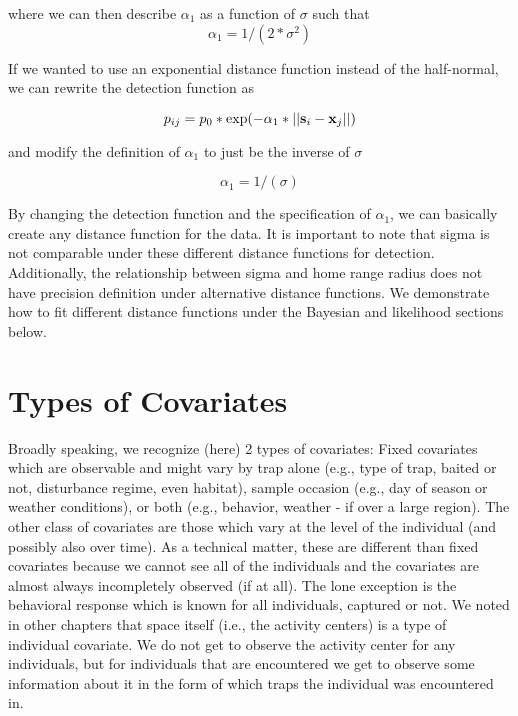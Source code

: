where we can then describe $\alpha_1$ as a function of $\sigma$ such that
\[
\alpha_{1} = 1/(2*\sigma^2)
\]

If we wanted to use an exponential distance function instead of the half-normal, we can rewrite the detection function as

\[
p_{ij} = p_{0}*\exp(-\alpha_{1} *||{\bf s}_{i}-{\bf x}_{j}||)
\]

and modify the definition of $\alpha_1$ to just be the inverse of $\sigma$

\[
\alpha_{1} = 1/(\sigma)
\]

By changing the detection function and the specification of
$\alpha_1$, we can basically create any distance function for the
data.  It is important to note that sigma is not comparable under
these different distance functions for detection.  Additionally, the
relationship between sigma and home range radius does not have
precision definition under alternative distance functions.  We demonstrate how to fit different distance functions under the Bayesian and likelihood sections below.


\section{Types of Covariates}


Broadly speaking, we recognize (here) 2 types of covariates: Fixed covariates which are observable and might vary by trap alone (e.g., type of trap, baited or not, disturbance regime, even habitat), sample occasion (e.g., day of season or weather conditions), or both (e.g., behavior, weather - if over a large region).  The other class of covariates are those which vary at the level of the individual (and possibly also over time).   As a technical matter, these are different than fixed covariates because we cannot see all of the individuals and the covariates are almost always incompletely observed (if at all).  The lone exception is the behavioral response which is known for all individuals, captured or not.  We noted in other chapters that space itself (i.e., the activity centers) is a type of individual covariate. We do not get to observe the activity center for any individuals, but for individuals that are encountered we get to observe some information about it in the form of which traps the individual was encountered in.

